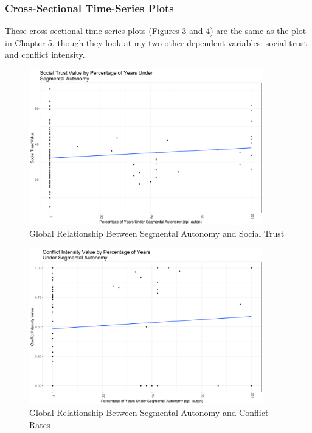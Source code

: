 \documentclass[12pt]{article}
\begin{document}
\subsubsection{Cross-Sectional Time-Series Plots}

These cross-sectional time-series plots (Figures 3 and 4) are the same as the plot in Chapter 5, though they look at my two other dependent variables; social trust and conflict intensity.

\begin{figure}[!htbp]
	\begin{center}
		\includegraphics[width = 4in]{csts_qog_hum_trust.png}
	\end{center}
	\caption{Global Relationship Between Segmental Autonomy and Social Trust}
\end{figure}

\begin{figure}[!htbp]
	\begin{center}
		\includegraphics[width = 4in]{csts_ucdp_cumulative_intensity.png}
	\end{center}
	\caption{Global Relationship Between Segmental Autonomy and Conflict Rates}
\end{figure}
\end{document}
